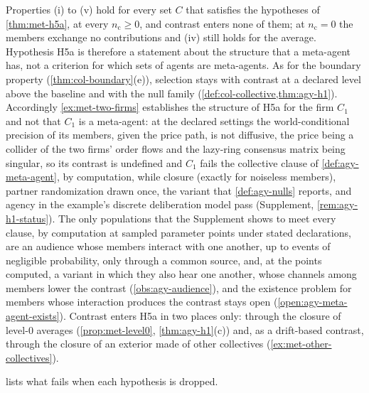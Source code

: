 \begin{remark}\label{rem:met-no-selection}
Properties (i) to (v) hold for every set $C$ that satisfies the hypotheses of \cref{thm:met-h5a}, at every $n_{\mathrm c}\ge0$, and contrast enters none of them; at $n_{\mathrm c}=0$ the members exchange no contributions and (iv) still holds for the average. Hypothesis H5a is therefore a statement about the structure that a meta-agent has, not a criterion for which sets of agents are meta-agents. As for the boundary property (\cref{thm:col-boundary}(e)), selection stays with contrast at a declared level above the baseline and with the null family (\cref{def:col-collective,thm:agy-h1}). Accordingly \cref{ex:met-two-firms} establishes the structure of H5a for the firm $C_1$ and not that $C_1$ is a meta-agent: at the declared settings the world-conditional precision of its members, given the price path, is not diffusive, the price being a collider of the two firms' order flows and the lazy-ring consensus matrix being singular, so its contrast is undefined and $C_1$ fails the collective clause of \cref{def:agy-meta-agent}, by computation, while closure (exactly for noiseless members), partner randomization drawn once, the variant that \cref{def:agy-nulls} reports, and agency in the example's discrete deliberation model pass (Supplement, \cref{rem:agy-h1-status}). The only populations that the Supplement shows to meet every clause, by computation at sampled parameter points under stated declarations, are an audience whose members interact with one another, up to events of negligible probability, only through a common source, and, at the points computed, a variant in which they also hear one another, whose channels among members lower the contrast (\cref{obs:agy-audience}), and the existence problem for members whose interaction produces the contrast stays open (\cref{open:agy-meta-agent-exists}). Contrast enters H5a in two places only: through the closure of level-0 averages (\cref{prop:met-level0}, \cref{thm:agy-h1}(c)) and, as a drift-based contrast, through the closure of an exterior made of other collectives (\cref{ex:met-other-collectives}).
\end{remark}

 lists what fails when each hypothesis is dropped.

